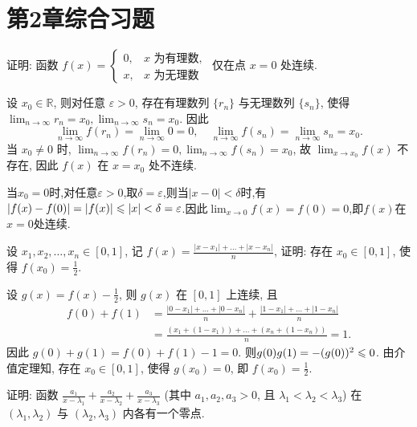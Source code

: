 \section{第2章综合习题}

\begin{exercise}[2.C.1]
    证明: 函数 $f(x) = \begin{cases} 0, & x \text{ 为有理数}, \\ x, & x \text{ 为无理数} \end{cases}$ 仅在点 $x=0$ 处连续.
\end{exercise}

\begin{solution}
    设 $x_0 \in \mathbb{R}$, 则对任意 $\varepsilon > 0$, 存在有理数列 $\{r_n\}$ 与无理数列 $\{s_n\}$, 使得 $\lim_{n \to \infty} r_n = x_0, \lim_{n \to \infty} s_n = x_0$. 因此
    $$ \lim_{n \to \infty} f(r_n) = \lim_{n \to \infty} 0 = 0, \quad \lim_{n \to \infty} f(s_n) = \lim_{n \to \infty} s_n = x_0. $$
    当 $x_0 \ne 0$ 时, $\lim_{n \to \infty} f(r_n) = 0, \lim_{n \to \infty} f(s_n) = x_0$, 故 $\lim_{x \to x_0} f(x)$ 不存在, 因此 $f(x)$ 在 $x=x_0$ 处不连续.

    当$x_0 = 0$时,对任意$\varepsilon > 0$,取$\delta = \varepsilon$,则当$|x-0| < \delta$时,有$|f(x)-f(0)| = |f(x)| \leqslant |x| < \delta = \varepsilon$.因此$\lim_{x \to 0} f(x) = f(0) = 0$,即$f(x)$在$x=0$处连续.
\end{solution}

\begin{exercise}[2.C.2]
    设 $x_1, x_2, \dots, x_n \in [0,1]$, 记 $f(x) = \frac{|x-x_1|+\dots+|x-x_n|}{n}$, 证明: 存在 $x_0 \in [0,1]$, 使得 $f(x_0) = \frac{1}{2}$.
\end{exercise}

\begin{solution}
    设 $g(x) = f(x) - \frac{1}{2}$, 则 $g(x)$ 在 $[0,1]$ 上连续, 且
    \begin{align*}
        f(0) + f(1) & = \frac{|0-x_1|+\dots+|0-x_n|}{n} + \frac{|1-x_1|+\dots+|1-x_n|}{n} \\
                    & = \frac{(x_1 + (1-x_1)) + \dots + (x_n + (1-x_n))}{n} = 1.
    \end{align*}
    因此 $g(0) + g(1) = f(0) + f(1) - 1 = 0$. 则$g(0) g(1) = -(g(0))^2 \leqslant 0$. 由介值定理知, 存在 $x_0 \in [0,1]$, 使得 $g(x_0) = 0$, 即 $f(x_0) = \frac{1}{2}$.
\end{solution}

\begin{exercise}[2.C.3]
    证明: 函数 $\frac{a_1}{x-\lambda_1} + \frac{a_2}{x-\lambda_2} + \frac{a_3}{x-\lambda_3}$ (其中 $a_1, a_2, a_3 > 0$, 且 $\lambda_1 < \lambda_2 < \lambda_3$) 在 $(\lambda_1, \lambda_2)$ 与 $(\lambda_2, \lambda_3)$ 内各有一个零点.
\end{exercise}

